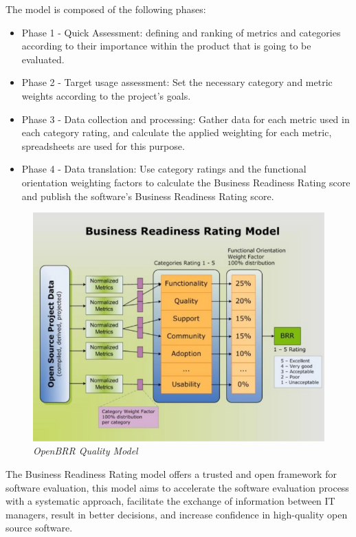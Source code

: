 \documentclass[a4paper,12pt]{book}
\begin{document}
The model is composed of the following phases:
\begin{itemize}
\item Phase 1 - Quick Assessment: defining and ranking of metrics and categories according to their importance within the product that is going to be evaluated.
\item Phase 2 - Target usage assessment: Set the necessary category and metric weights according to the project's goals.
\item Phase 3 - Data collection and processing: Gather data for each metric used in each category rating, and calculate the applied weighting for each metric, spreadsheets are used for this purpose.
\item Phase 4 - Data translation: Use category ratings and the functional orientation weighting factors to calculate the Business Readiness Rating score and publish the software’s Business Readiness Rating score.
\end{itemize}

\begin{figure}[H]
    \centering
    \includegraphics[width=12cm, keepaspectratio]{img/openbrr.png}
    \caption{\textit{OpenBRR Quality Model}}
    \label{figure:openbrr}
 \end{figure}

The Business Readiness Rating model offers a trusted and open framework for software evaluation, this model aims to accelerate the software evaluation process with a systematic approach, facilitate the exchange of information between IT managers, result in better decisions, and increase confidence in high-quality open source software.
\end{document}
